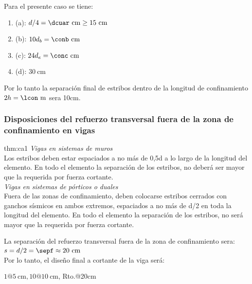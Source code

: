 Para el presente caso se tiene:
\begin{enumerate}
\item[] (a): $d / 4=\dcuar\mathrm{~cm} \geq 15 \mathrm{~cm}$
\item[] (b): $10d_{b}=\conb\mathrm{~cm}$
\item[] (c): $24d_{e}=\conc\mathrm{~cm}$
\item[] (d): $30 \mathrm{~cm}$
\end{enumerate}
Por lo tanto la separación final de estribos dentro de la longitud de confinamiento $2h=\lcon\mathrm{~m}$ sera 10cm.
\newpage
\subsubsection{Disposiciones del refuerzo transversal fuera de la zona de confinamiento en vigas}
\begin{theo}[Art. 21.4.4.4 y 21.5.3.2 :]{thm:ca1}
\textit{Vigas en sistemas de muros}\\
Los estribos deben estar espaciados a no más de 0,5d a lo largo de la longitud del elemento. En todo el elemento la separación de los estribos, no deberá ser mayor que la requerida por fuerza cortante. \\
\textit{Vigas en sistemas de pórticos o duales}\\
Fuera  de  las  zonas  de  confinamiento,  deben  colocarse  estribos  cerrados con  ganchos sísmicos en ambos extremos, espaciados a no más de d/2 en toda la longitud del elemento. En todo el elemento la separación de los estribos, no será mayor que la requerida por fuerza cortante.
\end{theo}
\noindent La separación del refuerzo transversal fuera de la zona de confinamiento sera: $s=d/2=\sepf\approx20\mathrm{~cm}$\\
Por lo tanto, el diseño final a cortante de la viga será:
\begin{center}
$1 @ 5 \mathrm{~cm}, 10 @ 10 \mathrm{~cm}$, Rto.@20cm   
\end{center}
